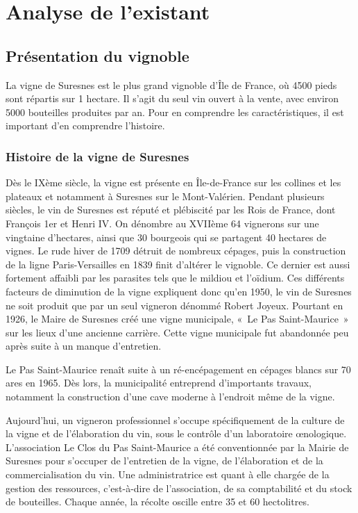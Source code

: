 \documentclass[a4paper, titlepage]{report}
\begin{document}
\clearpage
\tableofcontents
\clearpage
\listoffigures
\clearpage

\chapter{Analyse de l'existant}

\section{Présentation du vignoble}

La vigne de Suresnes est le plus grand vignoble d'Île de France, où 4500
pieds sont répartis sur 1 hectare. Il s'agit du seul vin ouvert à la
vente, avec environ 5000 bouteilles produites par an. Pour en comprendre
les caractéristiques, il est important d'en comprendre l'histoire.

\subsection{Histoire de la vigne de Suresnes}

Dès le IXème siècle, la vigne est présente en Île-de-France sur les
collines et les plateaux et notamment à Suresnes sur le Mont-Valérien.
Pendant plusieurs siècles, le vin de Suresnes est réputé et plébiscité
par les Rois de France, dont François 1er et Henri IV. On dénombre au
XVIIème 64 vignerons sur une vingtaine d'hectares, ainsi que 30
bourgeois qui se partagent 40 hectares de vignes. Le rude hiver de 1709
détruit de nombreux cépages, puis la construction de la ligne
Paris-Versailles en 1839 finit d'altérer le vignoble. Ce dernier est
aussi fortement affaibli par les parasites tels que le mildiou et
l'oïdium. Ces différents facteurs de diminution de la vigne expliquent
donc qu'en 1950, le vin de Suresnes ne soit produit que par un seul
vigneron dénommé Robert Joyeux. Pourtant en 1926, le Maire de Suresnes
créé une vigne municipale, «~Le Pas Saint-Maurice~» sur les lieux d'une
ancienne carrière. Cette vigne municipale fut abandonnée peu après suite
à un manque d'entretien.

Le Pas Saint-Maurice renaît suite à un ré-encépagement en cépages blancs
sur 70 ares en 1965. Dès lors, la municipalité entreprend d'importants
travaux, notamment la construction d'une cave moderne à l'endroit même
de la vigne.

Aujourd'hui, un vigneron professionnel s'occupe spécifiquement de la
culture de la vigne et de l'élaboration du vin, sous le contrôle d'un
laboratoire œnologique. L'association Le Clos du Pas Saint-Maurice a été
conventionnée par la Mairie de Suresnes pour s'occuper de l'entretien de
la vigne, de l'élaboration et de la commercialisation du vin. Une
administratrice est quant à elle chargée de la gestion des ressources,
c'est-à-dire de l'association, de sa comptabilité et du stock de
bouteilles. Chaque année, la récolte oscille entre 35 et 60 hectolitres.
\end{document}
